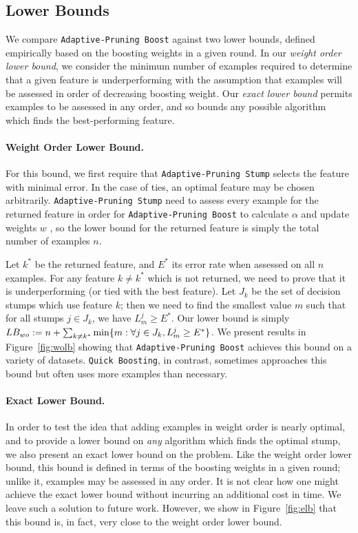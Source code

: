 \subsection{Lower Bounds}\label{lb}




We compare \texttt{Adaptive-Pruning Boost} against two lower bounds, defined empirically based
on the boosting weights in a given round.
In our \emph{weight order lower bound}, we consider the minimum number
of examples required to determine that a given feature is underperforming
with the assumption that examples will be assessed in order of decreasing
boosting weight.
Our \emph{exact lower bound} permits examples to be assessed in any order,
and so bounds any possible algorithm which finds the best-performing feature.

\paragraph{Weight Order Lower Bound.}
For this bound, we first require that \texttt{Adaptive-Pruning Stump} selects the feature with
minimal error.
In the case of ties, an optimal feature may be chosen arbitrarily.
\texttt{Adaptive-Pruning Stump} need to assess every example for the returned
feature in order for \texttt{Adaptive-Pruning Boost} to calculate $\alpha$ and update weights $w$ , so the lower
bound for the returned feature is simply the total number of examples $n$.

Let $k^*$ be the returned feature, and $E^*$ its error rate
when assessed on all $n$ examples.
For any feature $k \ne k^*$ which is not returned, we need to prove that it is
underperforming (or tied with the best feature).
Let $J_k$ be the set of decision stumps which use feature $k$;
then we need to find the smallest value $m$ such that for all stumps
$j \in J_k$, we have $L^j_m \ge E^*$.
Our lower bound is simply 
$	LB_{wo} :=
	n + \sum_{k \ne k^*} \min \Set{m : \forall j \in J_k, L^j_{m} \ge E^*}$.
We present results in Figure~\ref{fig:wolb} showing that \texttt{Adaptive-Pruning Boost}
achieves this bound on a variety of datasets.
\texttt{Quick Boosting}, in contrast, sometimes approaches
this bound but often uses more examples than necessary.


\paragraph{Exact Lower Bound.}
In order to test the idea that adding examples in weight order is nearly optimal,
and to provide a lower bound on \emph{any} algorithm which finds the
optimal stump, we also present an exact lower bound on the problem.
Like the weight order lower bound, this bound is defined in terms of the boosting
weights in a given round; unlike it, examples may be assessed in any order.
It is not clear how one might achieve the exact lower bound without incurring an
additional cost in time.
We leave such a solution to future work.
However, we show in Figure~\ref{fig:elb} that this bound is, in fact,
very close to the weight order lower bound.

